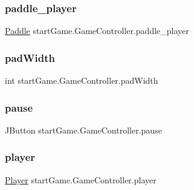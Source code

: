 \subsubsection{\texorpdfstring{paddle\+\_\+player}{paddle\_player}}
{\footnotesize\ttfamily \hyperlink{classmodel_1_1_paddle}{Paddle} start\+Game.\+Game\+Controller.\+paddle\+\_\+player\hspace{0.3cm}{\ttfamily [private]}}

\hypertarget{classstart_game_1_1_game_controller_a27e5857e2a63e94e92410f8794064db9}{}\label{classstart_game_1_1_game_controller_a27e5857e2a63e94e92410f8794064db9} 
\subsubsection{\texorpdfstring{pad\+Width}{padWidth}}
{\footnotesize\ttfamily int start\+Game.\+Game\+Controller.\+pad\+Width\hspace{0.3cm}{\ttfamily [private]}}

\hypertarget{classstart_game_1_1_game_controller_a4e3d3be632fb6b997c987cb5f516d447}{}\label{classstart_game_1_1_game_controller_a4e3d3be632fb6b997c987cb5f516d447} 
\subsubsection{\texorpdfstring{pause}{pause}}
{\footnotesize\ttfamily J\+Button start\+Game.\+Game\+Controller.\+pause\hspace{0.3cm}{\ttfamily [private]}}

\hypertarget{classstart_game_1_1_game_controller_ad110380b2d709650ead4b69885fe920e}{}\label{classstart_game_1_1_game_controller_ad110380b2d709650ead4b69885fe920e} 
\subsubsection{\texorpdfstring{player}{player}}
{\footnotesize\ttfamily \hyperlink{classmodel_1_1_player}{Player} start\+Game.\+Game\+Controller.\+player\hspace{0.3cm}{\ttfamily [private]}}

